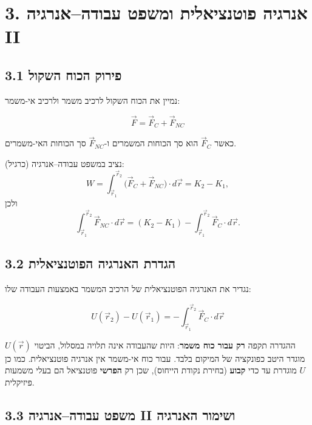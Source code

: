 \documentclass[12pt, a4paper]{article}
\newcommand{\hvec}[1]{\overrightarrow{#1}}
\begin{document}
\section*{3. אנרגיה פוטנציאלית ומשפט עבודה--אנרגיה II}

\subsection*{3.1 פירוק הכוח השקול}

נמיין את הכוח השקול לרכיב משמר ולרכיב אי-משמר:
\begin{tcolorbox}[resultbox]
\[
  \hvec{F} = \hvec{F}_C + \hvec{F}_{NC}
\]
\end{tcolorbox}
כאשר \textenglish{$\hvec{F}_C$} הוא סך הכוחות המשמרים ו-\textenglish{$\hvec{F}_{NC}$} סך הכוחות האי-משמרים.

נציב במשפט עבודה--אנרגיה (כרגיל):
\[
  W = \int_{\hvec{r}_1}^{\hvec{r}_2}\!\bigl(\hvec{F}_C + \hvec{F}_{NC}\bigr)\cdot d\hvec{r}
    = K_2 - K_1 ,
\]
ולכן
\[
  \int_{\hvec{r}_1}^{\hvec{r}_2}\!\hvec{F}_{NC}\cdot d\hvec{r}
   = (K_2 - K_1) - \int_{\hvec{r}_1}^{\hvec{r}_2}\!\hvec{F}_C\cdot d\hvec{r} .
\]

\subsection*{3.2 הגדרת האנרגיה הפוטנציאלית}

נגדיר את האנרגיה הפוטנציאלית של הרכיב המשמר באמצעות העבודה שלו:

\begin{tcolorbox}[defbox, title={אנרגיה פוטנציאלית (\textenglish{Potential Energy})}]
\[
  U(\hvec{r}_2) - U(\hvec{r}_1)
   = -\int_{\hvec{r}_1}^{\hvec{r}_2}\!\hvec{F}_C\cdot d\hvec{r}
\]
\end{tcolorbox}

\begin{tcolorbox}[notebox, title={הערה}]
ההגדרה תקפה \textbf{רק עבור כוח משמר}: היות שהעבודה אינה תלויה במסלול, הביטוי \textenglish{$U(\hvec{r})$} מוגדר היטב כפונקציה של המיקום בלבד. עבור כוח אי-משמר אין אנרגיה פוטנציאלית. כמו כן \textenglish{$U$} מוגדרת עד כדי \textbf{קבוע} (בחירת נקודת הייחוס), שכן רק \textbf{הפרשי} פוטנציאל הם בעלי משמעות פיזיקלית.
\end{tcolorbox}

\subsection*{3.3 משפט עבודה--אנרגיה II ושימור האנרגיה}
\end{document}
